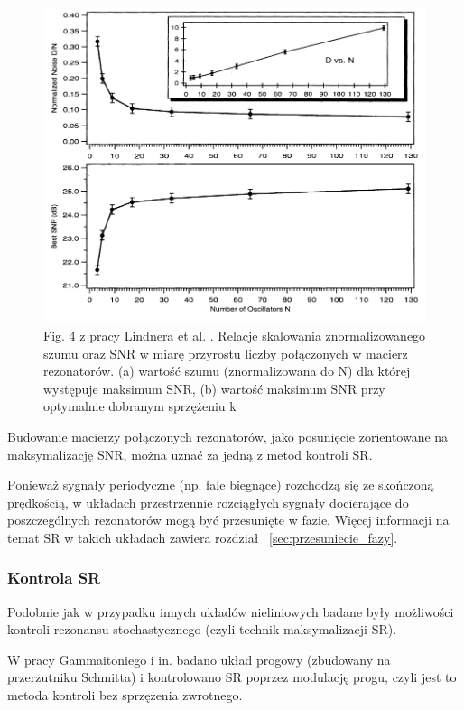   \begin{figure}
    \includegraphics[width=120mm]{images/lindner_meadows.png}
    \caption{Fig. 4 z pracy Lindnera et al. \cite{lindner_meadows}. Relacje skalowania znormalizowanego szumu oraz SNR w miarę przyrostu liczby połączonych w macierz rezonatorów. (a) wartość szumu (znormalizowana do N) dla której występuje maksimum SNR, (b) wartość maksimum SNR przy optymalnie dobranym sprzężeniu k}
    \label{fig:graphics:lindner_meadows}
  \end{figure}

  Budowanie macierzy połączonych rezonatorów, jako posunięcie zorientowane na maksymalizację SNR, można uznać za jedną z metod kontroli SR.

  Ponieważ sygnały periodyczne (np. fale biegnące) rozchodzą się ze skończoną prędkością, w układach przestrzennie rozciągłych sygnały docierające do poszczególnych rezonatorów mogą być przesunięte w fazie. Więcej informacji na temat SR w takich układach zawiera rozdział ~\ref{sec:przesuniecie_fazy}.

  \subsubsection{Kontrola SR}
  
  Podobnie jak w przypadku innych układów nieliniowych badane były możliwości kontroli rezonansu stochastycznego (czyli technik maksymalizacji SR). 

  W pracy Gammaitoniego i in. \cite{gammaitoni} badano układ progowy (zbudowany na przerzutniku Schmitta) i kontrolowano SR poprzez modulację progu, czyli jest to metoda kontroli bez sprzężenia zwrotnego. 

